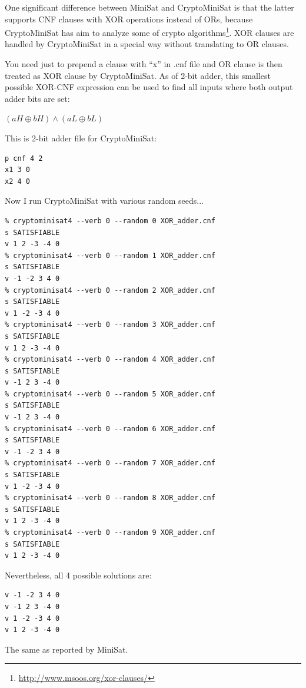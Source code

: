 One significant difference between MiniSat and CryptoMiniSat is that the latter supports CNF clauses with XOR operations instead of ORs,
because CryptoMiniSat has aim to analyze some of crypto algorithms\footnote{\url{http://www.msoos.org/xor-clauses/}}.
XOR clauses are handled by CryptoMiniSat in a special way without translating to OR clauses.

You need just to prepend a clause with ``x'' in .cnf file and OR clause is then treated as XOR clause by CryptoMiniSat.
As of 2-bit adder, this smallest possible XOR-CNF expression can be used to find all inputs where both output adder bits are set:

$(aH \oplus bH) \wedge (aL \oplus bL)$

This is 2-bit adder  file for CryptoMiniSat:

\begin{lstlisting}
p cnf 4 2
x1 3 0
x2 4 0
\end{lstlisting}

Now I run CryptoMiniSat with various random seeds...

\begin{lstlisting}
% cryptominisat4 --verb 0 --random 0 XOR_adder.cnf
s SATISFIABLE
v 1 2 -3 -4 0
% cryptominisat4 --verb 0 --random 1 XOR_adder.cnf
s SATISFIABLE
v -1 -2 3 4 0
% cryptominisat4 --verb 0 --random 2 XOR_adder.cnf
s SATISFIABLE
v 1 -2 -3 4 0
% cryptominisat4 --verb 0 --random 3 XOR_adder.cnf
s SATISFIABLE
v 1 2 -3 -4 0
% cryptominisat4 --verb 0 --random 4 XOR_adder.cnf
s SATISFIABLE
v -1 2 3 -4 0
% cryptominisat4 --verb 0 --random 5 XOR_adder.cnf
s SATISFIABLE
v -1 2 3 -4 0
% cryptominisat4 --verb 0 --random 6 XOR_adder.cnf
s SATISFIABLE
v -1 -2 3 4 0
% cryptominisat4 --verb 0 --random 7 XOR_adder.cnf
s SATISFIABLE
v 1 -2 -3 4 0
% cryptominisat4 --verb 0 --random 8 XOR_adder.cnf
s SATISFIABLE
v 1 2 -3 -4 0
% cryptominisat4 --verb 0 --random 9 XOR_adder.cnf
s SATISFIABLE
v 1 2 -3 -4 0
\end{lstlisting}

Nevertheless, all 4 possible solutions are:

\begin{lstlisting}
v -1 -2 3 4 0
v -1 2 3 -4 0
v 1 -2 -3 4 0
v 1 2 -3 -4 0
\end{lstlisting}

The same as reported by MiniSat.




